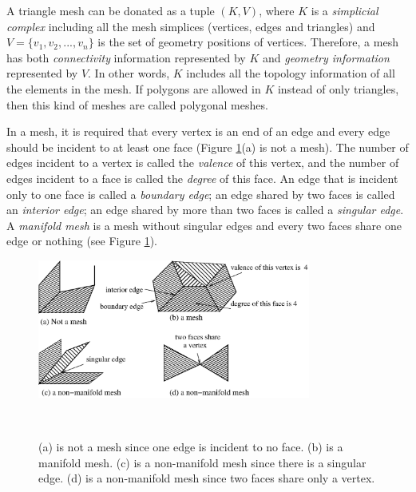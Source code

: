     A triangle mesh can be donated as a tuple $(K, V)$, where $K$ is a
    \emph{simplicial complex} including all the mesh simplices 
    (vertices, edges and triangles) and $V =\{v_{1}, v_{2}, ...,
    v_{n}\}$ is the set of geometry positions of vertices. Therefore,
    a mesh has both \emph{connectivity} information represented by $K$
    and \emph{geometry information} represented by $V$. In other
    words, $K$ includes all the topology information of all the
    elements in the mesh. If
    polygons are allowed in $K$ instead of only triangles, then this
    kind of meshes are called polygonal meshes.

    In a mesh, it is required that every
    vertex is an end of an edge and every edge should be incident to at
    least one face (Figure \ref{mesh_non_mesh}(a) is not a mesh).
    The number of edges incident to a vertex is called the
    \emph{valence} of this vertex, and the number of edges incident to
    a face is called the \emph{degree} of this face. An edge that is 
    incident only to one face is called a \emph{boundary edge}; an edge
    shared by two faces is called an \emph{interior edge}; an edge
    shared by more than two faces is called a \emph{singular edge}. A
    \emph{manifold mesh} is a mesh without singular edges and every
    two faces share one edge or nothing (see Figure \ref{mesh_non_mesh}).
\begin{figure}
\centering
\includegraphics[width=0.8\textwidth]{figure2.1.eps}
\caption[Manifold mesh, non-manifold mesh and non-mesh]{ (a) is not
a mesh since one edge is incident to no face. (b) is a manifold
mesh. (c) is a non-manifold mesh since there is a singular edge.
(d) is a non-manifold mesh since two faces share only a
vertex.\label{mesh_non_mesh}}\
\end{figure}

